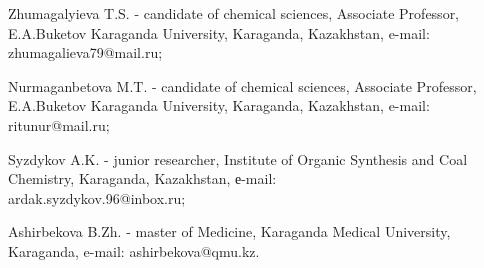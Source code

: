 \begin{info}
Zhumagalyieva T.S. - candidate of chemical sciences, Associate
Professor, E.A.Buketov Karaganda University, Karaganda, Kazakhstan,
e-mail: zhumagalieva79@mail.ru;

Nurmaganbetova M.T. - candidate of chemical sciences, Associate
Professor, E.A.Buketov Karaganda University, Karaganda, Kazakhstan,
e-mail: ritunur@mail.ru;

Syzdykov A.K. - junior researcher, Institute of Organic Synthesis and
Coal Chemistry, Karaganda, Kazakhstan, е-mail:\\
ardak.syzdykov.96@inbox.ru;

Ashirbekova B.Zh. - master of Medicine, Karaganda Medical University,
Karaganda, e-mail:
ashirbekova@qmu.kz.
\end{info}
